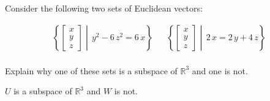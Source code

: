 
\begin{exerciseStatement}


Consider the following two sets of Euclidean vectors: 


\begin{align*}  \left\{ \left[\begin{array}{c}
x \\
y \\
z
\end{array}\right] \middle|\,y^{2} - 6 \, z^{2} = 6 \, x\right\}  & &   \left\{ \left[\begin{array}{c}
x \\
y \\
z
\end{array}\right] \middle|\,2 \, x = 2 \, y + 4 \, z\right\}  \\ \end{align*}
            

 Explain why one of these sets is a subspace of \(\mathbb{R}^ 3 \) and one is not. 


\end{exerciseStatement}
    
\begin{exerciseAnswer} 


\(U\) is a subspace of \(\mathbb{R}^ 3 \) and \(W\) is not.


\end{exerciseAnswer}
    

